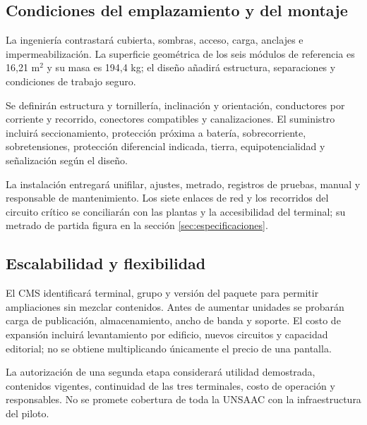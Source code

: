 \subsection{Condiciones del emplazamiento y del montaje}
La ingeniería contrastará cubierta, sombras, acceso, carga, anclajes e impermeabilización. La superficie geométrica de los seis módulos de referencia es 16,21 m$^2$ y su masa es 194,4 kg; el diseño añadirá estructura, separaciones y condiciones de trabajo seguro.

Se definirán estructura y tornillería, inclinación y orientación, conductores por corriente y recorrido, conectores compatibles y canalizaciones. El suministro incluirá seccionamiento, protección próxima a batería, sobrecorriente, sobretensiones, protección diferencial indicada, tierra, equipotencialidad y señalización según el diseño.

La instalación entregará unifilar, ajustes, metrado, registros de pruebas, manual y responsable de mantenimiento. Los siete enlaces de red y los recorridos del circuito crítico se conciliarán con las plantas y la accesibilidad del terminal; su metrado de partida figura en la sección \ref{sec:especificaciones}.

\subsection{Escalabilidad y flexibilidad}
El CMS identificará terminal, grupo y versión del paquete para permitir ampliaciones sin mezclar contenidos. Antes de aumentar unidades se probarán carga de publicación, almacenamiento, ancho de banda y soporte. El costo de expansión incluirá levantamiento por edificio, nuevos circuitos y capacidad editorial; no se obtiene multiplicando únicamente el precio de una pantalla.

La autorización de una segunda etapa considerará utilidad demostrada, contenidos vigentes, continuidad de las tres terminales, costo de operación y responsables. No se promete cobertura de toda la UNSAAC con la infraestructura del piloto.
